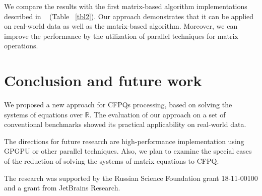 \documentclass[sigconf]{acmart}
\begin{document}
We compare the results with the first matrix-based algorithm implementations described in ~\cite{azimov2018context} (Table ~\ref{tbl2}). 
Our approach demonstrates that it can be applied on real-world data as well as the matrix-based algorithm. 
Moreover, we can improve the performance by the utilization of parallel techniques for matrix operations.

\section{Conclusion and future work}

We proposed a new approach for CFPQs processing, based on solving the systems of equations over $\mathbb{R}$.
The evaluation of our approach on a set of conventional benchmarks showed its practical applicability on real-world data.

The directions for future research are high-performance implementation using GPGPU or other parallel techniques. 
Also, we plan to examine the special cases of the reduction of solving the systems of matrix equations to CFPQ.


\begin{acks}
The research was supported by the Russian Science Foundation grant 18-11-00100 and a grant from JetBrains Research.
\end{acks}




\end{document}
